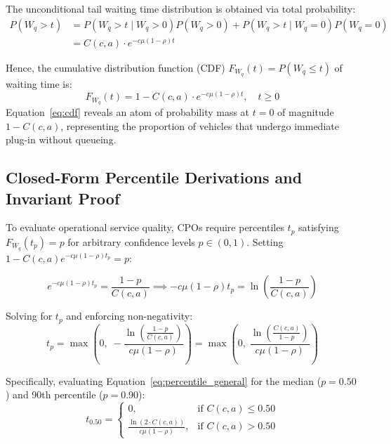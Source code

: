 \documentclass[preprint,12pt,authoryear]{elsarticle}
\begin{document}
The unconditional tail waiting time distribution is obtained via total probability:
\begin{align}
P(W_q > t) &= P(W_q > t \mid W_q > 0) P(W_q > 0) + P(W_q > t \mid W_q = 0) P(W_q = 0) \nonumber \\
&= C(c, a) \cdot e^{-c\mu(1-\rho)t}
\end{align}

Hence, the cumulative distribution function (CDF) $F_{W_q}(t) = P(W_q \le t)$ of waiting time is:
\begin{equation}
\label{eq:cdf}
F_{W_q}(t) = 1 - C(c, a) \cdot e^{-c\mu(1-\rho)t}, \quad t \ge 0
\end{equation}
Equation~\eqref{eq:cdf} reveals an atom of probability mass at $t = 0$ of magnitude $1 - C(c, a)$, representing the proportion of vehicles that undergo immediate plug-in without queueing.

\subsection{Closed-Form Percentile Derivations and Invariant Proof}
To evaluate operational service quality, CPOs require percentiles $t_p$ satisfying $F_{W_q}(t_p) = p$ for arbitrary confidence levels $p \in (0, 1)$. Setting $1 - C(c, a) e^{-c\mu(1-\rho)t_p} = p$:

\begin{equation}
e^{-c\mu(1-\rho)t_p} = \frac{1 - p}{C(c, a)} \implies -c\mu(1-\rho)t_p = \ln\left( \frac{1-p}{C(c, a)} \right)
\end{equation}

Solving for $t_p$ and enforcing non-negativity:
\begin{equation}
\label{eq:percentile_general}
t_p = \max\left(0, \; -\frac{\ln\left(\frac{1 - p}{C(c, a)}\right)}{c\mu(1-\rho)}\right) = \max\left(0, \; \frac{\ln\left(\frac{C(c, a)}{1 - p}\right)}{c\mu(1-\rho)}\right)
\end{equation}

Specifically, evaluating Equation~\eqref{eq:percentile_general} for the median ($p = 0.50$) and 90th percentile ($p = 0.90$):
\begin{equation}
\label{eq:p50}
t_{0.50} = 
\begin{cases} 
0, & \text{if } C(c, a) \le 0.50 \\ 
\frac{\ln(2 \cdot C(c, a))}{c\mu(1-\rho)}, & \text{if } C(c, a) > 0.50 
\end{cases}
\end{equation}
\end{document}
